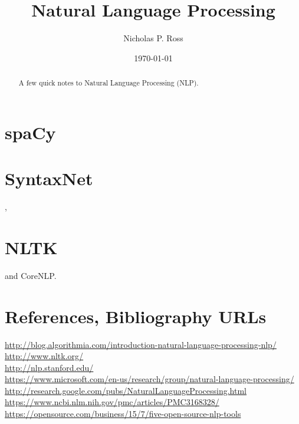 \documentclass[11pt]{article}
\begin{document}
\title{Natural Language Processing}
\author{Nicholas P. Ross}
\date{\today}
\maketitle


\begin{abstract}
A few quick notes to Natural Language Processing (NLP).
\end{abstract}


\newpage
\section{spaCy}

\newpage
\section{SyntaxNet}, 


\newpage 
\section{NLTK} and CoreNLP.

\section{References, Bibliography URLs}
\href{http://blog.algorithmia.com/introduction-natural-language-processing-nlp/}{http://blog.algorithmia.com/introduction-natural-language-processing-nlp/}\\
\href{http://www.nltk.org/}{http://www.nltk.org/}\\
\href{http://nlp.stanford.edu/}{http://nlp.stanford.edu/}\\
\href{https://www.microsoft.com/en-us/research/group/natural-language-processing/}{https://www.microsoft.com/en-us/research/group/natural-language-processing/}\\
\href{http://research.google.com/pubs/NaturalLanguageProcessing.html}{http://research.google.com/pubs/NaturalLanguageProcessing.html}\\
\href{https://www.ncbi.nlm.nih.gov/pmc/articles/PMC3168328/}{https://www.ncbi.nlm.nih.gov/pmc/articles/PMC3168328/}\\
\href{https://opensource.com/business/15/7/five-open-source-nlp-tools}{https://opensource.com/business/15/7/five-open-source-nlp-tools}\\









\end{document}
